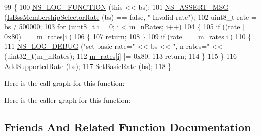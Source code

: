 \begin{DoxyCode}
99 \{
100   \hyperlink{log-macros-disabled_8h_a90b90d5bad1f39cb1b64923ea94c0761}{NS\_LOG\_FUNCTION} (\textcolor{keyword}{this} << bs);
101   \hyperlink{assert_8h_aff5ece9066c74e681e74999856f08539}{NS\_ASSERT\_MSG} (\hyperlink{classns3_1_1SupportedRates_a60fabea64f3e9789f33743525c0bac6d}{IsBssMembershipSelectorRate} (bs) == \textcolor{keyword}{false}, \textcolor{stringliteral}{"
      Invalid rate"});
102   uint8\_t rate = bs / 500000;
103   \textcolor{keywordflow}{for} (uint8\_t \hyperlink{bernuolliDistribution_8m_a6f6ccfcf58b31cb6412107d9d5281426}{i} = 0; \hyperlink{bernuolliDistribution_8m_a6f6ccfcf58b31cb6412107d9d5281426}{i} < \hyperlink{classns3_1_1SupportedRates_a48bc8bd88b3c7abae9fcd75fd40c4279}{m\_nRates}; \hyperlink{bernuolliDistribution_8m_a6f6ccfcf58b31cb6412107d9d5281426}{i}++)
104     \{
105       \textcolor{keywordflow}{if} ((rate | 0x80) == \hyperlink{classns3_1_1SupportedRates_a4b17159f12e29a88e82b8a92507e4884}{m\_rates}[\hyperlink{bernuolliDistribution_8m_a6f6ccfcf58b31cb6412107d9d5281426}{i}])
106         \{
107           \textcolor{keywordflow}{return};
108         \}
109       \textcolor{keywordflow}{if} (rate == \hyperlink{classns3_1_1SupportedRates_a4b17159f12e29a88e82b8a92507e4884}{m\_rates}[i])
110         \{
111           \hyperlink{group__logging_ga413f1886406d49f59a6a0a89b77b4d0a}{NS\_LOG\_DEBUG} (\textcolor{stringliteral}{"set basic rate="} << bs << \textcolor{stringliteral}{", n rates="} << (uint32\_t)m\_nRates);
112           \hyperlink{classns3_1_1SupportedRates_a4b17159f12e29a88e82b8a92507e4884}{m\_rates}[\hyperlink{bernuolliDistribution_8m_a6f6ccfcf58b31cb6412107d9d5281426}{i}] |= 0x80;
113           \textcolor{keywordflow}{return};
114         \}
115     \}
116   \hyperlink{classns3_1_1SupportedRates_a2507a6b7a8ce4dd538f34029d3b17602}{AddSupportedRate} (bs);
117   \hyperlink{classns3_1_1SupportedRates_a4178a4b7834b6a66e0c8efe4d92489bf}{SetBasicRate} (bs);
118 \}
\end{DoxyCode}


Here is the call graph for this function\+:




Here is the caller graph for this function\+:




\subsection{Friends And Related Function Documentation}
